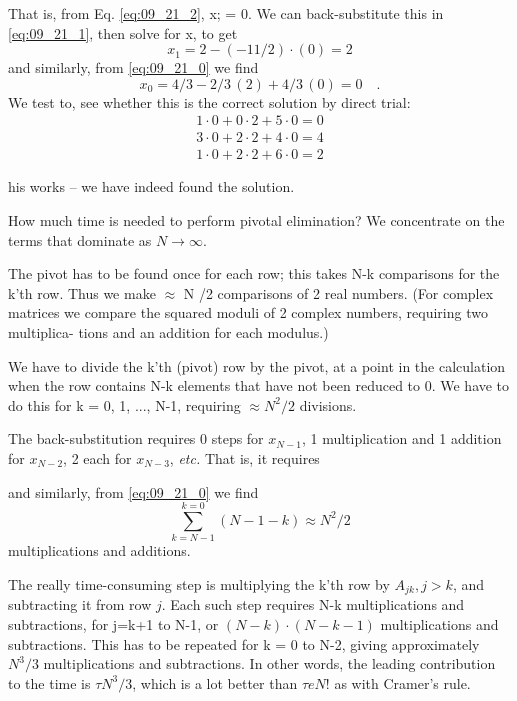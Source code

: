 That is, from Eq. \ref{eq:09_21_2}, x; = 0. We can back-substitute this in  \ref{eq:09_21_1},
then solve for x, to get
\begin{equation*}
    x_1 = 2 - (-11/2)\cdot(0) = 2
\end{equation*} 
and similarly, from \ref{eq:09_21_0} we find
\begin{equation*}
x_0 = 4/3 - 2/3\,(2)+4/3\,(0) = 0 \quad .
\end{equation*} 
We test to, see whether this is the correct solution by direct trial:
\begin{align*}
1 \cdot 0+0 \cdot 2+5 \cdot 0=0\\
3 \cdot 0+2 \cdot 2+4 \cdot 0=4\\
1 \cdot 0+2 \cdot 2+6 \cdot 0=2
\end{align*} 

his works -- we have indeed found the solution.


How much time is needed to perform pivotal elimination? We
concentrate on the terms that dominate as $N\to\infty$.

The pivot has to be found once for each row; this takes N-k
comparisons for the k'th row. Thus we make $\approx$ N /2 comparisons
of 2 real numbers. (For complex matrices we compare the
squared moduli of 2 complex numbers, requiring two multiplica-
tions and an addition for each modulus.)

We have to divide the k'th (pivot) row by the pivot, at a point in
the calculation when the row contains N-k elements that have not
been reduced to 0. We have to do this for k = 0, 1, ..., N-1, 
requiring $\approx N^2/2$ divisions.

The back-substitution requires 0 steps for $x_{N-1}$, 1 multiplication
and 1 addition for $x_{N-2}$, 2 each for $x_{N-3}$, \textit{etc.} That is, it requires

and similarly, from \ref{eq:09_21_0} we find
\begin{equation*}
    \sum_{k=N-1}^{k=0}(N-1-k) \approx N^2/2
\end{equation*} 
multiplications and additions.

The really time-consuming step is multiplying the k'th row by
$A_{jk}, j > k$, and subtracting it from row $j$. Each such step requires
N-k multiplications and subtractions, for j=k+1 to N-1, or
$(N -k) \cdot (N -k- 1)$ multiplications and subtractions. This has to be
repeated for k = 0 to N-2, giving approximately $N^3/3$ multiplications and subtractions. In other words, the leading contribution to the time is $\tau N^3/3$, which is a lot better than $\tau e N!$ as with
Cramer's rule.

